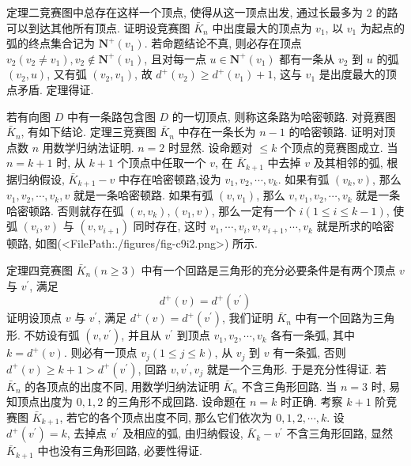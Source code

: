 定理二竞赛图中总存在这样一个顶点, 使得从这一顶点出发, 通过长最多为 2 的路可以到达其他所有顶点.
证明设竞赛图 $\bar{K}_n$ 中出度最大的顶点为 $v_1$, 以 $v_1$ 为起点的弧的终点集合记为 $\mathbf{N}^{+}\left(v_1\right)$. 若命题结论不真, 则必存在顶点 $v_2\left(v_2 \neq v_1\right), v_2 \notin \mathbf{N}^{+}\left(v_1\right)$, 且对每一点 $u \in \mathbf{N}^{+}\left(v_1\right)$ 都有一条从 $v_2$ 到 $u$ 的弧 $\left(v_2, u\right)$, 又有弧 $\left(v_2, v_1\right)$, 故 $d^{+}\left(v_2\right) \geqslant d^{+}\left(v_1\right)+1$, 这与 $v_1$ 是出度最大的顶点矛盾.
定理得证.



若有向图 $D$ 中有一条路包含图 $D$ 的一切顶点, 则称这条路为哈密顿路.
对竟赛图 $\bar{K}_n$, 有如下结论.
定理三竞赛图 $\bar{K}_n$ 中存在一条长为 $n-1$ 的哈密顿路.
证明对顶点数 $n$ 用数学归纳法证明.
$n=2$ 时显然.
设命题对 $\leqslant k$ 个顶点的竞赛图成立.
当 $n=k+1$ 时, 从 $k+1$ 个顶点中任取一个 $v$, 在 $\bar{K}_{k+1}$ 中去掉 $v$ 及其相邻的弧, 根据归纳假设, $\bar{K}_{k+1}-v$ 中存在哈密顿路,设为 $v_1, v_2, \cdots, v_k$.
如果有弧 $\left(v_k, v\right)$, 那么 $v_1, v_2, \cdots, v_k, v$ 就是一条哈密顿路.
如果有弧 $\left(v, v_1\right)$, 那么 $v, v_1, v_2, \cdots, v_k$ 就是一条哈密顿路.
否则就存在弧 $\left(v, v_k\right),\left(v_1, v\right)$, 那么一定有一个 $i(1 \leqslant i \leqslant k-1)$, 使弧 $\left(v_i, v\right)$ 与 $\left(v, v_{i+1}\right)$ 同时存在, 这时 $v_1, \cdots, v_i, v, v_{i+1}, \cdots, v_k$ 就是所求的哈密顿路, 如图(<FilePath:./figures/fig-c9i2.png>) 所示.



定理四竞赛图 $\bar{K}_n(n \geqslant 3)$ 中有一个回路是三角形的充分必要条件是有两个顶点 $v$ 与 $v^{\prime}$, 满足
$$
d^{+}(v)=d^{+}\left(v^{\prime}\right)
$$
证明设顶点 $v$ 与 $v^{\prime}$, 满足 $d^{+}(v)=d^{+}\left(v^{\prime}\right)$, 我们证明 $\bar{K}_n$ 中有一个回路为三角形.
不妨设有弧 $\left(v, v^{\prime}\right)$, 并且从 $v^{\prime}$ 到顶点 $v_1, v_2, \cdots, v_k$ 各有一条弧, 其中 $k=d^{+}(v)$. 则必有一顶点 $v_j(1 \leqslant j \leqslant k)$, 从 $v_j$ 到 $v$ 有一条弧, 否则 $d^{+}(v) \geqslant k+1>d^{+}\left(v^{\prime}\right)$, 回路 $v, v^{\prime}, v_j$ 就是一个三角形.
于是充分性得证.
若 $\bar{K}_n$ 的各顶点的出度不同, 用数学归纳法证明 $\bar{K}_n$ 不含三角形回路.
当 $n=3$ 时, 易知顶点出度为 $0,1,2$ 的三角形不成回路.
设命题在 $n=k$ 时正确.
考察 $k+1$ 阶竞赛图 $\bar{K}_{k+1}$, 若它的各个顶点出度不同, 那么它们依次为 $0,1,2, \cdots, k$. 设 $d^{+}\left(v^{\prime}\right)=k$, 去掉点 $v^{\prime}$ 及相应的弧, 由归纳假设, $\bar{K}_k-v^{\prime}$ 不含三角形回路, 显然 $\bar{K}_{k+1}$ 中也没有三角形回路, 必要性得证.



